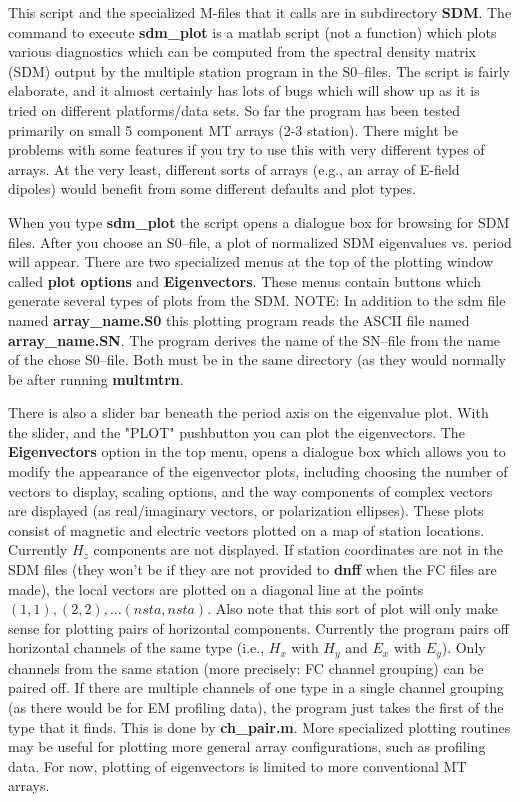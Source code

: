This script and the specialized M-files that it calls are in
subdirectory {\bf SDM}.  The command to execute
{\bf sdm\_plot} is a matlab script (not a function) which plots
various diagnostics which can be computed from the 
spectral density matrix (SDM) output by the multiple station
program in the S0--files.
The script is fairly elaborate, and it almost
certainly has lots of bugs which will show up as it is tried on
different platforms/data sets.
So far the program has been tested primarily on small 5
component MT arrays (2-3 station).  There might be
problems with some features if you try to use this with very different
types of arrays.  At the very least, different sorts of arrays 
(e.g., an array of E-field dipoles) would
benefit from some different defaults and plot types.

When you type {\bf sdm\_plot}
the script opens a dialogue box for browsing for SDM files.
After you choose an S0--file, a plot of normalized SDM eigenvalues
vs. period will appear.  There are two specialized menus
at the top of the plotting window called {\bf plot options}
and {\bf Eigenvectors}.  These menus contain buttons
which generate several types of plots from the SDM.
NOTE: In addition to the sdm file named {\bf array\_name.S0}
this plotting program reads the ASCII file named {\bf array\_name.SN}.
The program derives the name of the SN--file from the name of the
chose S0--file.  Both must be in the same directory (as they would normally
be after running {\bf multmtrn}.

There is also a slider bar beneath the period axis on the
eigenvalue plot.  With the slider, and the "PLOT" pushbutton
you can plot the eigenvectors.   The {\bf Eigenvectors}
option in the top menu, opens a dialogue box which allows you to
modify the appearance of the eigenvector plots, including choosing
the number of vectors to display, scaling options, and the way components of
complex vectors are displayed (as real/imaginary vectors, or polarization
ellipses).  These plots consist of
magnetic and electric vectors plotted on a map of station locations.
Currently $H_z$ components are not displayed.
If station coordinates are not in the SDM files (they won't be if
they are not provided to {\bf dnff} when the FC files are made),
the local vectors are plotted on a diagonal
line at the points $(1,1) , (2,2) , ... (nsta, nsta)$.
Also note that this sort of plot will only make sense for plotting
pairs of horizontal components.  Currently the program pairs off
horizontal channels of the same type (i.e., $H_x$ with $H_y$
and $E_x$ with $E_y$).  Only channels from the same station
(more precisely: FC channel grouping) can be paired off.
If there are multiple channels of one type in a single channel
grouping (as there would be for EM profiling data),
the program just takes the first of the type that it finds.
This is done by {\bf ch\_pair.m}.
More specialized plotting routines may be
useful for plotting more general array configurations, such as profiling
data.  For now, plotting of eigenvectors is limited to more conventional
MT arrays.

